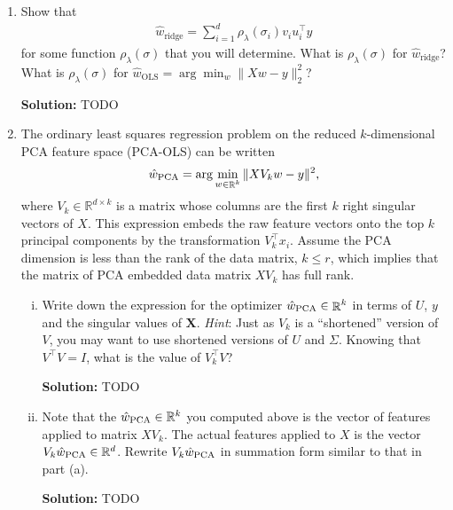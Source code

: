 \documentclass{article}
\DeclareMathOperator{\R}{\mathbb{R}}
\newcommand{\mat}[1]{\mathbf{#1}}
\newenvironment{solution}{\color{blue} \smallskip \textbf{Solution:}}{}
\begin{document}
\begin{enumerate}

\item Show that 
\begin{align*}
\widehat{w}_{\mathrm{ridge}} = \sum_{i=1}^d \rho_{\lambda}(\sigma_i) v_i  u_i^\top y
\end{align*}
for some function $\rho_{\lambda}(\sigma)$ that you will determine.
What is $\rho_{\lambda}(\sigma)$ for 
$\widehat{w}_{\mathrm{ridge}}$?
What is $\rho_{\lambda}(\sigma)$ for 
$\widehat{w}_{\mathrm{OLS}} = \arg \min_{w} \| X w - y\|_2^2$?

\begin{solution}
    TODO
\end{solution}

\newpage
\item The ordinary least squares regression problem on the reduced $k$-dimensional PCA feature space (PCA-OLS) can be written
\begin{equation*} \hatwPCA = \arg \min_{ {w}\in\R^k} \| X V_k {w}
- {y}\|^2, \end{equation*} where $V_k \in \mathbb{R}^{d \times k}$
is a matrix whose columns are the first $k$ right singular vectors of $X$.
This expression embeds the raw feature vectors onto the top $k$ principal components by the transformation $V_k^\top x_i$. Assume the PCA dimension is less than the rank of the data matrix, $k\leq r$, which implies that the matrix of PCA embedded data matrix $X V_k$ has full rank. 

\begin{enumerate}[(i)]
\item Write down the expression for the optimizer $\hatwPCA \in \R^k$ in terms of $U$, $y$ and the singular values of $\mat X$. 
\textit{Hint}: Just as $V_k$ is a ``shortened'' version of $V$, you may want to use shortened versions of $U$ and $\Sigma$. Knowing that $V^\top V = I$, what is the value of $V_k^\top V$?

\begin{solution}
  TODO
\end{solution}

\item Note that the $\hat{ {w}}_\text{{PCA}} \in \mathbb{R}^{k}$ you computed above is the vector of features applied to matrix $XV_{k}$. The actual features applied to $X$ is the vector $V_{k}\hat{ {w}}_\text{{PCA}} \in \mathbb{R}^{d}$. Rewrite $V_{k}\hat{ {w}}_\text{{PCA}}$ in summation form similar to that in part (a). 

\begin{solution}
    TODO
\end{solution}
\end{enumerate}


\end{enumerate}
\end{document}
